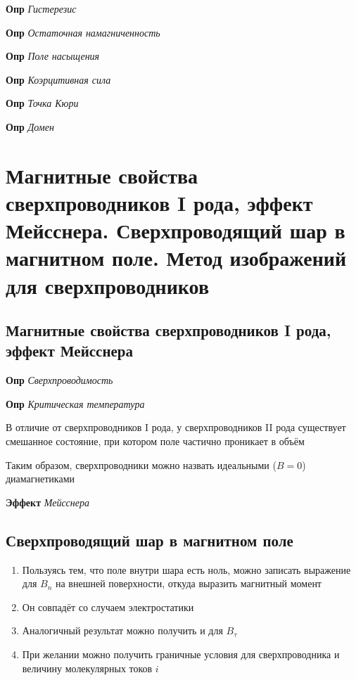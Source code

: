 \documentclass[a4paper, 14pt]{article}
\begin{document}
    \textbf{Опр} \textit{Гистерезис}
    
    \textbf{Опр} \textit{Остаточная намагниченность}
    
    \textbf{Опр} \textit{Поле насыщения}
    
    \textbf{Опр} \textit{Коэрцитивная сила}
    
    \textbf{Опр} \textit{Точка Кюри}
    
    \textbf{Опр} \textit{Домен}
    
    \section{Магнитные свойства сверхпроводников I рода, эффект Мейсснера.
    Сверхпроводящий шар в магнитном поле.
    Метод изображений для сверхпроводников}
    
    \subsection{Магнитные свойства сверхпроводников I рода, эффект Мейсснера}
    
    \textbf{Опр} \textit{Сверхпроводимость}
    
    \textbf{Опр} \textit{Критическая температура}
    
    В отличие от сверхпроводников I рода, у сверхпроводников II рода существует смешанное состояние, при котором поле
    частично проникает в объём
    
    Таким образом, сверхпроводники можно назвать идеальными ($B = 0$) диамагнетиками
    
    \textbf{Эффект} \textit{Мейсснера}
    
    \subsection{Сверхпроводящий шар в магнитном поле}
    
    \begin{enumerate}
        \item Пользуясь тем, что поле внутри шара есть ноль, можно записать выражение для $B_n$ на внешней
        поверхности, откуда выразить магнитный момент
        \item Он совпадёт со случаем электростатики
        \item Аналогичный результат можно получить и для $B_\tau$
        \item При желании можно получить граничные условия для сверхпроводника и величину молекулярных токов $i$
    \end{enumerate}
    
\end{document}
